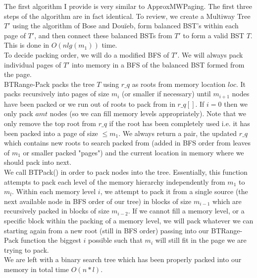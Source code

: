 \documentclass[letterpaper,12pt,titlepage,oneside,final]{book}
\theoremstyle{plain}
\begin{document}
The first algorithm I provide is very similar to ApproxMWPaging. The first three steps of the algorithm are in fact identical. To review, we create a Multiway Tree $T'$ using the algorithm of Bose and Dou\"{i}eb, form balanced BST's within each page of $T'$, and then connect these balanced BSTs from $T'$ to form a valid BST $T$. This is done in $O(n lg(m_1))$ time. \\

To decide packing order, we will do a modified BFS of $T'$. We will always pack individual pages of $T'$ into memory in a BFS of the balanced BST formed from the page. \\

BT\textendash Range-Pack packs the tree $T$ using $r\_q$ as roots from memory location $loc$. It packs recursively into pages of size $m_i$ (or smaller if necessary) until $m_{i+1}$ nodes have been packed or we run out of roots to pack from in $r\_q[]$. If $i=0$ then we only pack $amt$ nodes (so we can fill memory levels appropriately). Note that we only remove the top root from $r\_q$ if the root has been completely used i.e. it has been packed into a page of size $\leq m_1$. We always return a pair, the updated $r\_q$ which contains new roots to search packed from (added in BFS order from leaves of $m_1$ or smaller packed "pages") and the current location in memory where we should pack into next. \\

We call BT\textendash Pack() in order to pack nodes into the tree. Essentially, this function attempts to pack each level of the memory hierarchy independently from $m_1$ to $m_l$. Within each memory level $i$, we attempt to pack it from a single source (the next available node in BFS order of our tree) in blocks of size  $m_{i-1}$ which are recursively packed in blocks of size $m_{i-2}$. If we cannot fill a memory level, or a specific block within the packing of a memory level, we will pack whatever we can starting again from a new root (still in BFS order) passing into our BT\textendash Range-Pack function the biggest $i$ possible such that $m_i$ will still fit in the page we are trying to pack. \\

We are left with a binary search tree which has been properly packed into our memory in total time $O(n * l)$.
\end{document}
